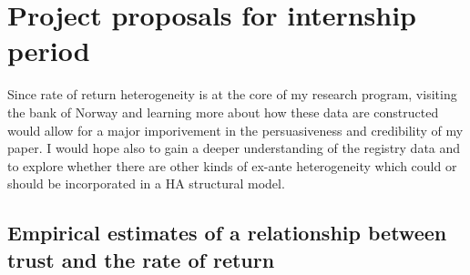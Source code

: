 \documentclass{scrartcl}
\begin{document}

\section{Project proposals for internship period}

Since rate of return heterogeneity is at the core of my research program, visiting the bank of Norway and learning more about how these data are constructed would allow for a major imporivement in the persuasiveness and credibility of my paper. I would hope also to gain a deeper understanding of the registry data and to explore whether there are other kinds of ex-ante heterogeneity which could or should be incorporated in a HA structural model.


\subsection{Empirical estimates of a relationship between trust and the rate of return}

\end{document}
